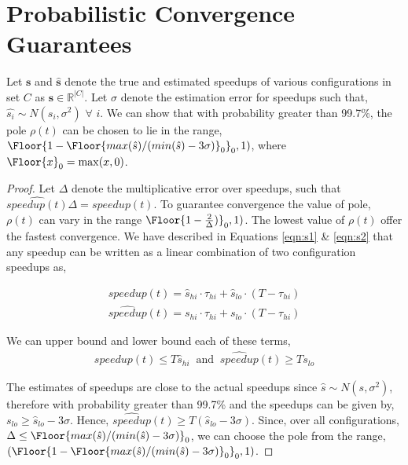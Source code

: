 \section{Probabilistic Convergence Guarantees}


\begin{theorem}
  Let $\mathbf{s}$ and $\hat{\mathbf{s}}$ denote the true and estimated speedups of various configurations in set $C$ as $\mathbf{s} \in \mathbb{R}^{|C|}$. Let $\sigma$ denote the
  estimation error for speedups such that, $\hat{s_i} \sim
  N(s_i, \sigma^2)$ $\forall$ $i$. We can show that with probability
  greater than 99.7\%, the pole $\rho(t)$ can be chosen to lie in the range, $\Floor{1- \Floor{max(\hat{s})/(min(\hat{s}) -  3\sigma)}_0}_0, 1)$, where $\Floor{x}_0 = \max(x,0)$.
\end{theorem}

\begin{proof}
Let $\Delta$ denote the multiplicative error over speedups, such that $ \widehat{speedup(t)}\Delta = speedup(t) $. To
guarantee convergence the value of pole, $\rho(t)$ can vary in the range
$\Floor{1-\frac{2}{\Delta})}_0, 1)$\cite{ICSE2014}. The lowest value of $\rho(t)$ offer the fastest convergence. We have described in Equations \ref{eqn:s1} \& \ref{eqn:s2} that any speedup can be written as a linear combination of two configuration speedups as,

\begin{align}
speedup(t) = \hat{s}_{hi} \cdot \tau_{hi} + \hat{s}_{lo} \cdot (T - \tau_{hi})
\end{align}
\begin{align}
\widehat{speedup}(t) = s_{hi} \cdot \tau_{hi} + s_{lo} \cdot (T - \tau_{hi})
\end{align}

We can upper bound and lower bound each of these terms,
\begin{align}
speedup(t) \leq T \hat{s}_{hi} \;\; \text{and} \;\; \widehat{speedup}(t) \geq T s_{lo}
\end{align}

The estimates of speedups are close to the actual speedups since
$\hat{s} \sim N(s, \sigma^2)$, therefore with probability greater
than 99.7\% and the speedups can be given by, $s_{lo} \geq
\hat{s}_{lo} - 3 \sigma$. Hence, $\widehat{speedup}(t) \geq T
(\hat{s}_{lo} -3 \sigma)$. Since, over all configurations, $\Delta \leq
\Floor{max(\hat{s})/(min(\hat{s}) - 3\sigma)}_0$,  we can choose the pole from the range,  $(\Floor{1- \Floor{max(\hat{s})/(min(\hat{s}) - 3\sigma)}_0}_0, 1)$.


\end{proof}
